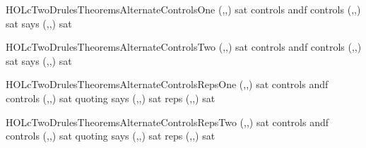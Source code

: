 \begin{SaveVerbatim}{HOLcTwoDrulesTheoremsAlternateControlsOne}
\HOLTokenTurnstile{} (,,) sat  controls  andf  controls  \HOLTokenImp{}
   (,,) sat  says  \HOLTokenImp{}
   (,,) sat 
\end{SaveVerbatim}
\newcommand{\HOLcTwoDrulesTheoremsAlternateControlsOne}{\UseVerbatim{HOLcTwoDrulesTheoremsAlternateControlsOne}}
\begin{SaveVerbatim}{HOLcTwoDrulesTheoremsAlternateControlsTwo}
\HOLTokenTurnstile{} (,,) sat  controls  andf  controls  \HOLTokenImp{}
   (,,) sat  says  \HOLTokenImp{}
   (,,) sat 
\end{SaveVerbatim}
\newcommand{\HOLcTwoDrulesTheoremsAlternateControlsTwo}{\UseVerbatim{HOLcTwoDrulesTheoremsAlternateControlsTwo}}
\begin{SaveVerbatim}{HOLcTwoDrulesTheoremsAlternateControlsRepsOne}
\HOLTokenTurnstile{} (,,) sat  controls  andf  controls  \HOLTokenImp{}
   (,,) sat  quoting  says  \HOLTokenImp{}
   (,,) sat reps    \HOLTokenImp{}
   (,,) sat 
\end{SaveVerbatim}
\newcommand{\HOLcTwoDrulesTheoremsAlternateControlsRepsOne}{\UseVerbatim{HOLcTwoDrulesTheoremsAlternateControlsRepsOne}}
\begin{SaveVerbatim}{HOLcTwoDrulesTheoremsAlternateControlsRepsTwo}
\HOLTokenTurnstile{} (,,) sat  controls  andf  controls  \HOLTokenImp{}
   (,,) sat  quoting  says  \HOLTokenImp{}
   (,,) sat reps    \HOLTokenImp{}
   (,,) sat 
\end{SaveVerbatim}
